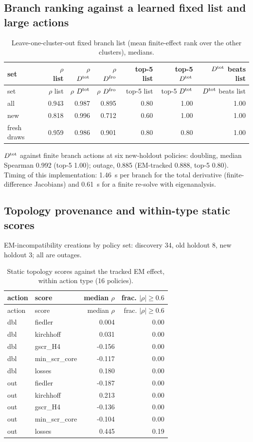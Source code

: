 \documentclass[10pt,a4paper]{article}
\begin{document}
\subsection{Branch ranking against a learned fixed list and large actions}
{\scriptsize
\begin{longtable}{lrrrrrr}
\caption{Leave-one-cluster-out fixed branch list (mean finite-effect rank over the other clusters), medians.}\label{tab:s-loco}\\
\toprule
set & $\rho$ list & $\rho$ $D^{\rm tot}$ & $\rho$ $D^{\rm fro}$ & top-5 list & top-5 $D^{\rm tot}$ & $D^{\rm tot}$ beats list \\
\midrule
\endfirsthead
\toprule
set & $\rho$ list & $\rho$ $D^{\rm tot}$ & $\rho$ $D^{\rm fro}$ & top-5 list & top-5 $D^{\rm tot}$ & $D^{\rm tot}$ beats list \\
\midrule
\endhead
all & 0.943 & 0.987 & 0.895 & 0.80 & 1.00 & 1.00 \\
new & 0.818 & 0.996 & 0.712 & 0.60 & 1.00 & 1.00 \\
fresh draws & 0.959 & 0.986 & 0.901 & 0.80 & 0.80 & 1.00 \\
\bottomrule
\end{longtable}}

$D^{\rm tot}$ against finite branch actions at six new-holdout policies: doubling, median Spearman 0.992 (top-5 1.00); outage, 0.885 (EM-tracked 0.888, top-5 0.80). Timing of this implementation: 1.46~s per branch for the total derivative (finite-difference Jacobians) and 0.61~s for a finite re-solve with eigenanalysis.

\subsection{Topology provenance and within-type static scores}
EM-incompatibility creations by policy set: discovery 34, old holdout 8, new holdout 3; all are outages.

{\scriptsize
\begin{longtable}{llrr}
\caption{Static topology scores against the tracked EM effect, within action type (16 policies).}\label{tab:s-topo}\\
\toprule
action & score & median $\rho$ & frac. $|\rho|\ge0.6$ \\
\midrule
\endfirsthead
\toprule
action & score & median $\rho$ & frac. $|\rho|\ge0.6$ \\
\midrule
\endhead
dbl & fiedler & 0.004 & 0.00 \\
dbl & kirchhoff & 0.031 & 0.00 \\
dbl & gscr\_H4 & -0.156 & 0.00 \\
dbl & min\_scr\_core & -0.117 & 0.00 \\
dbl & losses & 0.180 & 0.00 \\
out & fiedler & -0.187 & 0.00 \\
out & kirchhoff & 0.213 & 0.00 \\
out & gscr\_H4 & -0.136 & 0.00 \\
out & min\_scr\_core & -0.104 & 0.00 \\
out & losses & 0.445 & 0.19 \\
\bottomrule
\end{longtable}}
\end{document}
